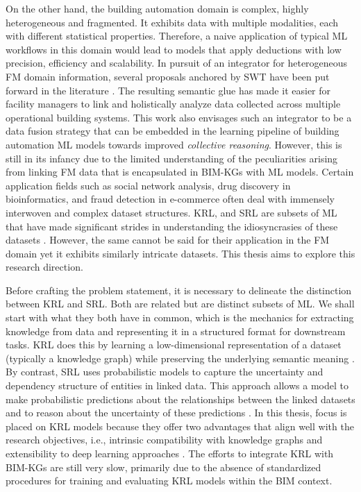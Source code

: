 On the other hand, the building automation domain is complex, highly heterogeneous and fragmented. It exhibits data with multiple modalities, each with different statistical properties. Therefore, a naive application of typical \ac{ML} workflows in this domain would lead to models that apply deductions with low precision, efficiency and scalability. In pursuit of an integrator for heterogeneous \ac{FM} domain information, several proposals anchored by \ac{SWT} have been put forward in the literature \citep{Pauwels, Pauwels2016, Pauwels2017a, Rasmussen2019a, Pauwels2022KnowledgeEnvironment}. The resulting semantic glue has made it easier for facility managers to link and holistically analyze data collected across multiple operational building systems. This work also envisages such an integrator to be a data fusion strategy that can be embedded in the learning pipeline of building automation \ac{ML} models towards improved \textit{collective reasoning}. However, this is still in its infancy due to the limited understanding of the peculiarities arising from linking \ac{FM} data that is encapsulated in \acp{BIM-KG} with \ac{ML} models. Certain application fields such as social network analysis, drug discovery in bioinformatics, and fraud detection in e-commerce often deal with immensely interwoven and complex dataset structures. \ac{KRL}, and \ac{SRL} are subsets of \ac{ML} that have made significant strides in understanding the idiosyncrasies of these datasets \citep{Nickel2011, Nickel2012FactorizingYAGO, 
Bengio2013RepresentationPerspectives,Nickel2016AGraphsb, Lin2018KnowledgeReview, Yi2022GraphApplications}. However, the same cannot be said for their application in the \ac{FM} domain yet it exhibits similarly intricate datasets. This thesis aims to explore this research direction. 

Before crafting the problem statement, it is necessary to delineate the distinction between \ac{KRL} and \ac{SRL}. Both are related but are distinct subsets of \ac{ML}. We shall start with what they both have in common, which is the mechanics for extracting knowledge from data and representing it in a structured format for downstream tasks. \ac{KRL} does this by learning a low-dimensional representation of a dataset (typically a knowledge graph) while preserving the underlying semantic meaning \citep{Liu2016KnowledgeReview}. By contrast, \ac{SRL} uses probabilistic models to capture the uncertainty and dependency structure of entities in linked data. This approach allows a model to make probabilistic predictions about the relationships between the linked datasets and to reason about the uncertainty of these predictions \cite{Ginestet2010IntroductionLearning}. In this thesis, focus is placed on \ac{KRL} models because they offer two advantages that align well with the research objectives, i.e., intrinsic compatibility with knowledge graphs \citep{Lin2018KnowledgeReview} and extensibility to deep learning approaches \citep{Wang2024LargeSurvey}. The efforts to integrate \ac{KRL} with \acp{BIM-KG} are still very slow, primarily due to the absence of standardized procedures for training and evaluating \ac{KRL} models within the \ac{BIM} context.

